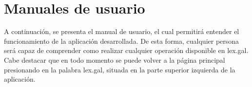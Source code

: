 \chapter{Manuales de usuario}
\label{enlacemanualusuario}

A continuación, se presenta el manual de usuario, el cual permitirá entender el funcionamiento de la aplicación desarrollada. De esta forma, cualquier persona será capaz de comprender como realizar cualquier operación disponible en lex.gal.
\\

Cabe destacar que en todo momento se puede volver a la página principal presionando en la palabra lex.gal, situada en la parte superior izquierda de la aplicación.








